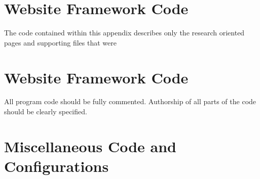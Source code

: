 \chapter{Website Framework Code}\label{appb:wejbcode}
The code contained within this appendix describes only the research oriented
pages and supporting files that were 


%

\chapter{Website Framework Code}\label{appb:webcode}
All program code should be fully commented. Authorship
of all parts of the code should be clearly specified. 

\chapter{Miscellaneous Code and Configurations}\label{appc:misccode}
